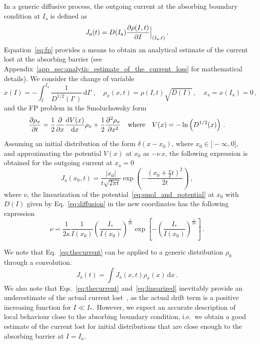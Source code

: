 {In a generic diffusive process, the outgoing current at the absorbing boundary condition at $I_\mathrm{a}$ is defined as
\begin{equation}
    J_\mathrm{a}(t) = D(I_\mathrm{a})\pdv{\rho(I, t)}{I} \Bigr|_{(I_\mathrm{a}, t)}\,.
    \label{eq:outgoing_current_definition}
\end{equation}
Equation~\eqref{eq:fp} provides a means to obtain an analytical estimate of the current lost at the absorbing barrier (see Appendix~\ref{app_sec:analytic_estimate_of_the_current_loss} for mathematical details). We consider the change of variable
\begin{equation}
    x(I) = -\int_I^{I_\mathrm{a}} \frac{1}{D^{1/2}(I')}\,\mathrm{d}I' \,, \quad \rho_x(x,t) = \rho(I, t) \sqrt{D(I)} \,, \quad x_\mathrm{a}=x(I_\mathrm{a})=0 \, ,
    \label{eq:change_of_variable}
\end{equation}
and the FP problem in the Smoluchowsky form
\begin{equation}
    \pdv{\rho_x}{t} = \frac{1}{2}\pdv{x} \dv{V(x)}{x} \rho_x+\frac{1}{2}\pdv[2]{\rho_x}{x} \quad \text{where} \quad V(x) = -\ln\left(D^{1/2}(x)\right) \, .
    \label{eq:smol_and_potential}
\end{equation}

Assuming an initial distribution of the form $\delta(x - x_0)$, where $x_0 \in ] -\infty, 0]$, and approximating the potential $V(x)$ at $x_0$ as $-\nu \, x$, the following expression is obtained for the outgoing current at $x_a = 0$
\begin{equation}
    J_\mathrm{a}(x_0, t) = \frac{|x_0|}{t\sqrt{2\pi t}}\exp\left(-\frac{(x_0+\frac{\nu}{2}t)^2}{2t}\right) \,,
    \label{eq:thecurrent}
\end{equation}
where $\nu$, the linearization of the potential~\eqref{eq:smol_and_potential} at $x_0$ with $D(I)$ given by Eq.~\eqref{eq:diffusion} in the new coordinates has the following expression
\begin{equation}
    \nu=\frac{1}{2\kappa}\frac{1}{I(x_0)}\left(\frac{I_\ast}{I(x_0)}\right)^{\frac{1}{2\kappa}}\exp\left[-\left(\frac{I_\ast}{I(x_0)}\right)^{\frac{1}{2\kappa}}\right]\,.
    \label{eq:linearized}
\end{equation}

We note that Eq.~\eqref{eq:thecurrent} can be applied to a generic distribution $\rho_0$ through a convolution.
\begin{equation}
    J_\mathrm{a}(t) = \int J_\mathrm{a}(x,t)\rho_x(x)\,\mathrm{d}x\,.
    \label{eq:current_convolution}
\end{equation}
We also note that Eqs.~\eqref{eq:thecurrent} and~\eqref{eq:linearized} inevitably provide an underestimate of the actual current lost~\cite{montanari:ipac2021:tupab233}, as the actual drift term is a positive increasing function for $I\ll I_\ast$. However, we expect an accurate description of local behaviour close to the absorbing boundary condition, i.e.\ we obtain a good estimate of the current lost for initial distributions that are close enough to the absorbing barrier at $I=I_\mathrm{a}$. 

}
